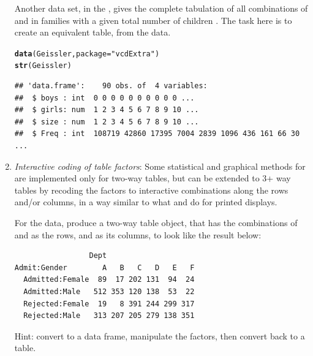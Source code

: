 \documentclass[11pt]{book}\usepackage[]{graphicx}\usepackage[]{color}
\makeatletter
\newcommand{\hlstr}[1]{\textcolor[rgb]{0.192,0.494,0.8}{#1}}%
\newcommand{\hlstd}[1]{\textcolor[rgb]{0.345,0.345,0.345}{#1}}%
\newcommand{\hlkwc}[1]{\textcolor[rgb]{0.333,0.667,0.333}{#1}}%
\newcommand{\hlkwd}[1]{\textcolor[rgb]{0.737,0.353,0.396}{\textbf{#1}}}%
\newenvironment{kframe}{%
 \def\at@end@of@kframe{}%
 \ifinner\ifhmode%
  \def\at@end@of@kframe{\end{minipage}}%
  \begin{minipage}{\columnwidth}%
 \fi\fi%
 \def\FrameCommand##1{\hskip\@totalleftmargin \hskip-\fboxsep
 \colorbox{shadecolor}{##1}\hskip-\fboxsep
     \hskip-\linewidth \hskip-\@totalleftmargin \hskip\columnwidth}%
 \MakeFramed {\advance\hsize-\width
   \@totalleftmargin\z@ \linewidth\hsize
   \@setminipage}}%
 {\par\unskip\endMakeFramed%
 \at@end@of@kframe}
\newenvironment{knitrout}{}{} %
\renewenvironment{knitrout}{\small\renewcommand{\baselinestretch}{.85}}{} %
\makeatother
\begin{document}
\begin{enumerate}
Another data set,  in the , gives the complete
tabulation of all combinations of  and  in families with
a given total number of children .  The task here is to create an
equivalent table,  from the  data.
\begin{knitrout}
\color{fgcolor}\begin{kframe}
\begin{alltt}
\hlkwd{data}\hlstd{(Geissler,} \hlkwc{package}\hlstd{=}\hlstr{"vcdExtra"}\hlstd{)}
\hlkwd{str}\hlstd{(Geissler)}
\end{alltt}
\begin{verbatim}
## 'data.frame':	90 obs. of  4 variables:
##  $ boys : int  0 0 0 0 0 0 0 0 0 0 ...
##  $ girls: num  1 2 3 4 5 6 7 8 9 10 ...
##  $ size : num  1 2 3 4 5 6 7 8 9 10 ...
##  $ Freq : int  108719 42860 17395 7004 2839 1096 436 161 66 30 ...
\end{verbatim}
\end{kframe}
\end{knitrout}


\item \emph{Interactive coding of table factors}:  Some statistical and graphical
\hard
methods for \ctabs are implemented only for two-way tables, but can be extended
to 3+ way tables by recoding the factors to interactive combinations along the
rows and/or columns, in a way similar to what  and 
do for printed displays.

For the  data, produce a two-way table object, 
that has the combinations of  and  as the rows, and
 as its columns, to look like the result below:
\begin{verbatim}
                 Dept
Admit:Gender        A   B   C   D   E   F
  Admitted:Female  89  17 202 131  94  24
  Admitted:Male   512 353 120 138  53  22
  Rejected:Female  19   8 391 244 299 317
  Rejected:Male   313 207 205 279 138 351
\end{verbatim}
Hint: convert to a data frame, manipulate the factors, then convert back to
a table.
\end{enumerate}
\end{document}
